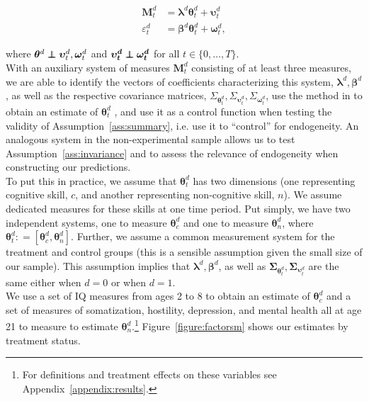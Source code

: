 \begin{eqnarray}\label{eq:sa-msystemmain}
\bm{M}_{t}^d &= \bm{\lambda}^d \bm{\theta}_{t}^d +  \bm{\upsilon}_t^d   \nonumber \\ 
\varepsilon_{t}^d &=\bm{\beta}^d \bm{\theta}_{t}^d + \bm{\omega}_{t}^d,  
\end{eqnarray}

\noindent where $\bm{\theta}^d  \independent \bm{\upsilon}_{t}^d,  \bm{\omega}_{t}^d$ and $\bm{\upsilon_{t}^d} \independent \bm{\omega_{t}^d}$ for all $t \in \{0, \ldots, T \}$.\\

\noindent With an auxiliary system of measures $\bm{M}_{t}^d $ consisting of at least three measures, we are able to identify the vectors of coefficients characterizing this system, $\bm{\lambda}^d, \bm{\beta}^d$, as well as the respective covariance matrices, $\Sigma_{\bm{\theta}_{t}^d}, \Sigma_{\bm{\upsilon}_{t}^d}, \Sigma_{\bm{\omega}_{t}^d}$, use the method in \citet{Bartlett_1938_Nature} to obtain an estimate of $\bm{\theta}_{t}^d$ \citep{Cunha_Heckman_ea_2005_oep,Cunha_Heckman_etal_2010_est_tech_cognoncog}, and use it as a control function when testing the validity of Assumption~\ref{ass:summary}, i.e. use it to ``control'' for endogeneity. An analogous system in the non-experimental sample allows us to test Assumption~\ref{ass:invariance} and to assess the relevance of endogeneity when constructing our predictions.\\

\noindent To put this in practice, we assume that $\bm{\theta}_{t}^d$ has two dimensions (one representing cognitive skill, $c$, and another representing non-cognitive skill, $n$). We assume dedicated measures for these skills at one time period. Put simply, we have two independent systems, one to measure $\bm{\theta}_{c}^d$ and one to measure $\bm{\theta}_{n}^d$, where $\bm{\theta}_{t}^d: = \left[ \bm{\theta}_{c}^d, \bm{\theta}_{n}^d \right]$. Further, we assume a common measurement system for the treatment and control groups (this is a sensible assumption given the small size of our sample). This assumption implies that $\bm{\lambda}^d, \bm{\beta}^d$, as well as $\bm{\Sigma}_{\bm{\theta}_{t}^d}, \bm{\Sigma}_{\bm{\upsilon}_{t}^d}$ are the same either when $d = 0$ or when $d = 1$.\\

\noindent We use a set of IQ measures from ages 2 to 8 to obtain an estimate of $\bm{\theta}_{c}^d$ and a set of measures of somatization, hostility, depression, and mental health all at age 21 to measure to estimate $\bm{\theta}_{n}^d$.\footnote{For definitions and treatment effects on these variables see Appendix~\ref{appendix:results}.} Figure~\ref{figure:factorsm} shows our estimates by treatment status.\\

